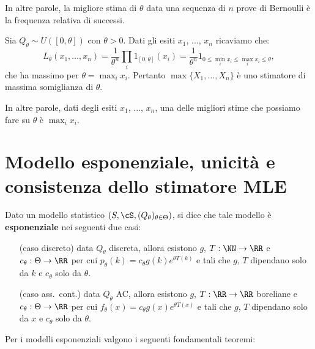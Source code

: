 \begin{multicols*}{2}
\begin{example}
    In altre parole, la migliore stima di $\theta$ data una sequenza di $n$ prove di Bernoulli è
    la frequenza relativa di successi.
\end{example}

\begin{example}
    Sia $Q_\theta \sim U([0, \theta])$ con $\theta > 0$. Dati gli esiti $x_1$, ..., $x_n$ ricaviamo che:
    \[
        L_\theta(x_1, \ldots, x_n) = \frac{1}{\theta^n} \prod_i 1_{[0, \theta]}(x_i) =
        \frac{1}{\theta^n} 1_{0 \leq \min_i x_i \leq \max_i x_i \leq \theta},
    \]
    che ha massimo per $\theta = \max_i x_i$. Pertanto $\max\{X_1, \ldots, X_n\}$ è uno stimatore
    di massima somiglianza di $\theta$. \smallskip

    In altre parole, dati degli esiti $x_1$, ..., $x_n$, una delle migliori stime che possiamo fare
    su $\theta$ è $\max_i x_i$.
\end{example}

\section{Modello esponenziale, unicità e consistenza dello stimatore MLE}

\begin{definition}
    Dato un modello statistico $(S, \cS, (Q_\theta)_{\theta \in \Theta})$, si dice che
    tale modello è \textbf{esponenziale} nei seguenti due casi:
    
    \begin{enumerate}[(i.)]
        \item[\scriptsize (caso discreto)] data $Q_\theta$ discreta, allora esistono
    $g$, $T : \NN \to \RR$ e $c_\theta : \Theta \to \RR$ per cui
    $p_\theta(k) = c_\theta g(k) e^{\theta T(k)}$ e tali che
    $g$, $T$ dipendano solo da $k$ e $c_\theta$ solo da $\theta$.
        \item[\scriptsize (caso ass.~cont.)] data $Q_\theta$ AC, allora esistono
        $g$, $T : \RR \to \RR$ boreliane e $c_\theta : \Theta \to \RR$ per cui
        $f_\theta(x) = c_\theta g(x) e^{\theta T(x)}$ e tali che
        $g$, $T$ dipendano solo da $x$ e $c_\theta$ solo da $\theta$.
    \end{enumerate}
\end{definition}

Per i modelli esponenziali valgono i seguenti fondamentali teoremi:


\end{multicols*}

